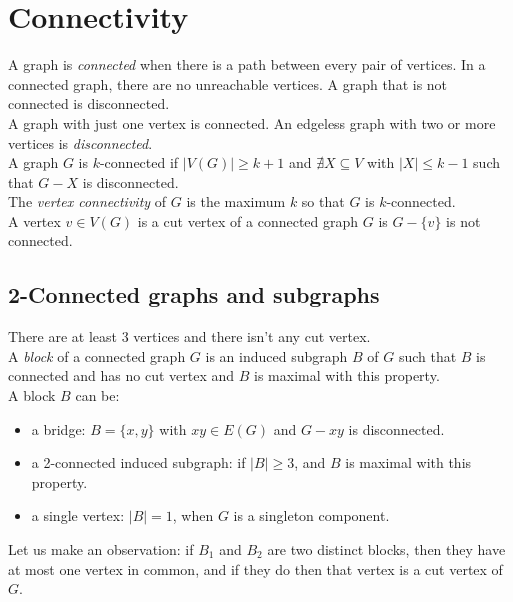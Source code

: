 \chapter{Connectivity}
	A graph is \textit{connected} when there is a path between every pair of vertices. In a connected graph, there are no unreachable vertices. A graph that is not connected is disconnected. \\
	
	A graph with just one vertex is connected. An edgeless graph with two or more vertices is \textit{disconnected}.\\
	
	A graph $G$ is $k$-connected if $|V(G)| \geq k + 1$ and $\nexists X \subseteq V$ with $|X| \leq k-1$ such that $G-X$ is disconnected.\\	
	
	The \textit{vertex connectivity} of $G$ is the maximum $k$ so that $G$ is $k$-connected.\\
	
	A vertex $v \in V(G)$ is a cut vertex of a connected graph $G$ is $G - \{ v \}$  is not connected.

	\section{2-Connected graphs and subgraphs}
		There are at least 3 vertices and there isn't any cut vertex.\\
		
		A \textit{block} of a connected graph $G$ is an induced subgraph $B$ of $G$ such that $B$ is connected and has no cut vertex and $B$ is maximal with this property.\\
		
		A block $B$ can be:
			\begin{itemize}
				\item a bridge: $B = \{x,y\}$ with $xy \in E(G)$ and $G - xy$ is disconnected.
				\item a 2-connected induced subgraph: if $|B| \geq 3$, and $B$ is maximal with this property.
				\item a single vertex: $|B| = 1$, when $G$ is a singleton component. 
			\end{itemize}
			
		Let us make an observation: if $B_1$ and $B_2$ are two distinct blocks, then they have at most one vertex in common, and if they do then that vertex is a cut vertex of $G$.\\
		

